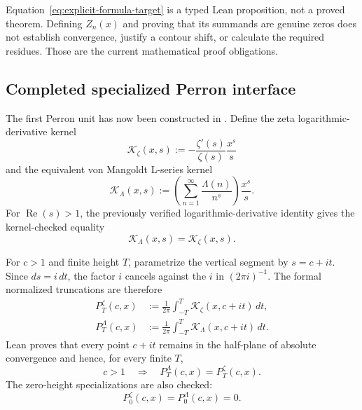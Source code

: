 \documentclass[11pt,a4paper]{article}
\newcommand{\RePart}{\operatorname{Re}}
\begin{document}
\begin{warningbox}
Equation~\eqref{eq:explicit-formula-target} is a typed Lean proposition, not a
proved theorem. Defining $Z_n(x)$ and proving that its summands are genuine
zeros does not establish convergence, justify a contour shift, or calculate
the required residues. Those are the current mathematical proof obligations.
\end{warningbox}

\clearpage
\subsection{Completed specialized Perron interface}
\label{subsec:perron-interface}

The first Perron unit has now been constructed in
. Define the zeta
logarithmic-derivative kernel
\begin{equation}
  \mathcal K_{\zeta}(x,s)
  :=-\frac{\zeta'(s)}{\zeta(s)}\frac{x^s}{s}
  \label{eq:zeta-perron-kernel}
\end{equation}
and the equivalent von Mangoldt L-series kernel
\begin{equation}
  \mathcal K_{\Lambda}(x,s)
  :=\left(\sum_{n=1}^{\infty}\frac{\Lambda(n)}{n^s}\right)
    \frac{x^s}{s}.
  \label{eq:von-mangoldt-perron-kernel}
\end{equation}
For $\RePart(s)>1$, the previously verified logarithmic-derivative identity
gives the kernel-checked equality
\begin{equation}
  \mathcal K_{\Lambda}(x,s)=\mathcal K_{\zeta}(x,s).
  \label{eq:perron-kernel-equality}
\end{equation}

For $c>1$ and finite height $T$, parametrize the vertical segment by
$s=c+it$. Since $ds=i\,dt$, the factor $i$ cancels against the $i$ in
$(2\pi i)^{-1}$. The formal normalized truncations are therefore
\begin{align}
  P^{\zeta}_T(c,x)
    &:=\frac{1}{2\pi}\int_{-T}^{T}
      \mathcal K_{\zeta}(x,c+it)\,dt,
      \label{eq:truncated-zeta-perron}\\
  P^{\Lambda}_T(c,x)
    &:=\frac{1}{2\pi}\int_{-T}^{T}
      \mathcal K_{\Lambda}(x,c+it)\,dt.
      \label{eq:truncated-von-mangoldt-perron}
\end{align}
Lean proves that every point $c+it$ remains in the half-plane of absolute
convergence and hence, for every finite $T$,
\begin{equation}
  c>1
  \quad\Longrightarrow\quad
  P^{\Lambda}_T(c,x)=P^{\zeta}_T(c,x).
  \label{eq:truncated-perron-equality}
\end{equation}
The zero-height specializations are also checked:
\[
  P^{\zeta}_0(c,x)=P^{\Lambda}_0(c,x)=0.
\]
\end{document}

